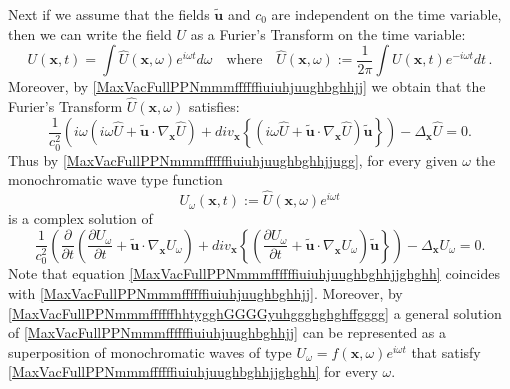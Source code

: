 \documentclass{article}
\theoremstyle{definition}
\theoremstyle{remark}
\renewcommand{\vec}[1]{\mathbf{#1}}
\newcommand{\er}{\eqref}
\newcommand{\er}{\eqref}
\begin{document}
Next if we assume that the fields $\vec {\tilde u}$ and $c_0$ are
independent on the time variable, then we can write the field $U$ as
a Furier's Transform on the time variable:
\begin{equation}\label{MaxVacFullPPNmmmffffffhhtygghGGGGyuhggghghghffgggg}
U(\vec x,t)=\int \hat U(\vec x,\omega)e^{i\omega
t}d\omega\quad\text{where}\quad\hat U(\vec
x,\omega):=\frac{1}{2\pi}\int U(\vec x,t)e^{-i\omega t}dt\,.
\end{equation}
Moreover, by \er{MaxVacFullPPNmmmffffffiuiuhjuughbghhjj} we obtain
that the Furier's Transform $\hat U(\vec x,\omega)$ satisfies:
\begin{equation}\label{MaxVacFullPPNmmmffffffiuiuhjuughbghhjjugg}
\frac{1}{c^2_0}\left(i\omega\left(i\omega \hat U+\vec {\tilde
u}\cdot\nabla_{\vec x}\hat U\right)+div_{\vec x}
\left\{\left(i\omega \hat U+\vec {\tilde u}\cdot\nabla_{\vec x} \hat
U\right)\vec {\tilde u}\right\}\right)-\Delta_{\vec x}\hat U=0.
\end{equation}
Thus by \er{MaxVacFullPPNmmmffffffiuiuhjuughbghhjjugg}, for every
given $\omega$ the monochromatic wave type function
\begin{equation}\label{MaxVacFullPPNmmmffffffhhtygghGGGGyuhggghghghffgggguiu}
U_\omega(\vec x,t):=\hat U(\vec x,\omega)e^{i\omega t}
\end{equation}
is a complex solution of
\begin{equation}\label{MaxVacFullPPNmmmffffffiuiuhjuughbghhjjghghh}
\frac{1}{c^2_0}\left(\frac{\partial}{\partial t}\left(\frac{\partial
U_\omega}{\partial t}+\vec {\tilde u}\cdot\nabla_{\vec
x}U_\omega\right)+div_{\vec x} \left\{\left(\frac{\partial
U_\omega}{\partial t}+\vec {\tilde u}\cdot\nabla_{\vec x}
U_\omega\right)\vec {\tilde u}\right\}\right)-\Delta_{\vec
x}U_\omega=0.
\end{equation}
Note that equation \er{MaxVacFullPPNmmmffffffiuiuhjuughbghhjjghghh}
coincides with \er{MaxVacFullPPNmmmffffffiuiuhjuughbghhjj}.
Moreover, by \er{MaxVacFullPPNmmmffffffhhtygghGGGGyuhggghghghffgggg}
a general solution of \er{MaxVacFullPPNmmmffffffiuiuhjuughbghhjj}
can be represented as a superposition of monochromatic waves of type
$U_\omega=f(\vec x,\omega)e^{i\omega t}$ that satisfy
\er{MaxVacFullPPNmmmffffffiuiuhjuughbghhjjghghh} for every $\omega$.
\end{document}
